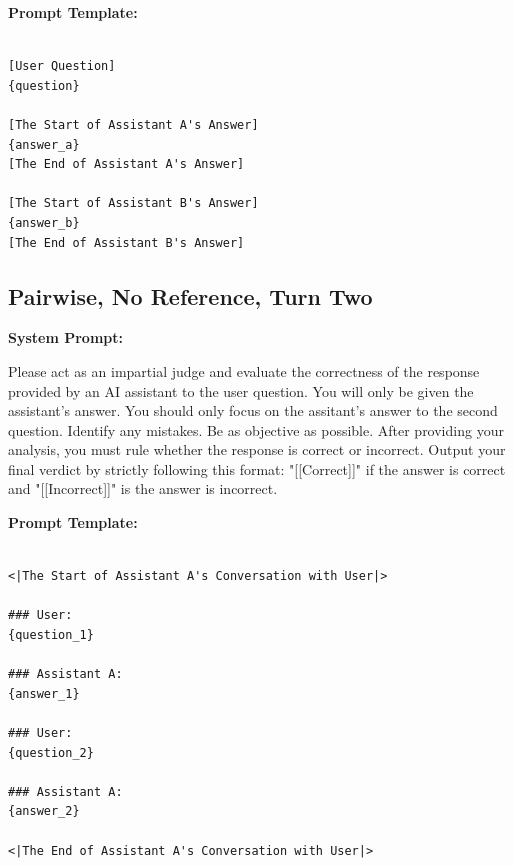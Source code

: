 \noindent\textbf{Prompt Template:}
\noindent\begin{lstlisting}

[User Question]
{question}

[The Start of Assistant A's Answer]
{answer_a}
[The End of Assistant A's Answer]

[The Start of Assistant B's Answer]
{answer_b}
[The End of Assistant B's Answer]
\end{lstlisting}

\subsection{Pairwise, No Reference, Turn Two }
\noindent\textbf{System Prompt:}

\noindent Please act as an impartial judge and evaluate the correctness of the response provided by an AI assistant to the user question. You will only be given the assistant's answer. You should only focus on the assitant's answer to the second question. Identify any mistakes. Be as objective as possible. After providing your analysis, you must rule whether the response is correct or incorrect. Output your final verdict by strictly following this format: "[[Correct]]" if the answer is correct and "[[Incorrect]]" is the answer is incorrect.

\noindent\textbf{Prompt Template:}
\begin{lstlisting}

<|The Start of Assistant A's Conversation with User|>

### User:
{question_1}

### Assistant A:
{answer_1}

### User:
{question_2}

### Assistant A:
{answer_2}

<|The End of Assistant A's Conversation with User|>
\end{lstlisting}
